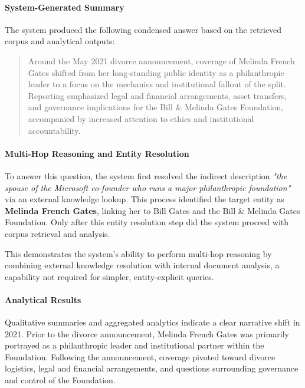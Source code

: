 \paragraph{System-Generated Summary}

The system produced the following condensed answer based on the retrieved corpus and analytical outputs:

\begin{quote}
Around the May 2021 divorce announcement, coverage of Melinda French Gates shifted from her long-standing public identity as a philanthropic leader to a focus on the mechanics and institutional fallout of the split. Reporting emphasized legal and financial arrangements, asset transfers, and governance implications for the Bill \& Melinda Gates Foundation, accompanied by increased attention to ethics and institutional accountability.
\end{quote}

\paragraph{Multi-Hop Reasoning and Entity Resolution}

To answer this question, the system first resolved the indirect description \textit{"the spouse of the Microsoft co-founder who runs a major philanthropic foundation"} via an external knowledge lookup. This process identified the target entity as \textbf{Melinda French Gates}, linking her to Bill Gates and the Bill \& Melinda Gates Foundation. Only after this entity resolution step did the system proceed with corpus retrieval and analysis.

This demonstrates the system’s ability to perform multi-hop reasoning by combining external knowledge resolution with internal document analysis, a capability not required for simpler, entity-explicit queries.

\paragraph{Analytical Results}

Qualitative summaries and aggregated analytics indicate a clear narrative shift in 2021. Prior to the divorce announcement, Melinda French Gates was primarily portrayed as a philanthropic leader and institutional partner within the Foundation. Following the announcement, coverage pivoted toward divorce logistics, legal and financial arrangements, and questions surrounding governance and control of the Foundation.

